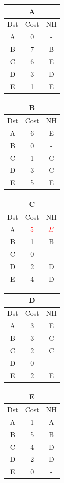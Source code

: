 \documentclass[10pt]{article}
\begin{document}
	\begin{table}[h!]
		\begin{tabular}{|c||c||c|}
 			\hline
	 		\multicolumn{3}{|c|}{A} \\
 			\hline
 			Dst & Cost & NH\\
 			\hline
 			A & 0 & - \\
 			B & 7 & B \\
 			C & 6 & E  \\
 			D & 3 & D \\
 			E & 1 & E \\
 			\hline
		\end{tabular}
		\begin{tabular}{|c||c||c|}
 			\hline
	 		\multicolumn{3}{|c|}{B} \\
 			\hline
 			Dst & Cost & NH\\
 			\hline
 			A & 6 & E \\
 			B & 0 & - \\
 			C & 1 & C  \\
 			D & 3 & C \\
 			E & 5 & E \\
 			\hline
		\end{tabular}
		\begin{tabular}{|c||c||c|}
 			\hline
	 		\multicolumn{3}{|c|}{C} \\
 			\hline
 			Dst & Cost & NH\\
 			\hline
 			A & $\color{red} 5$ & $\color{red} E$ \\
 			B & 1 & B \\
 			C & 0 & - \\
 			D & 2 & D \\
 			E & 4 & D \\
 			\hline
		\end{tabular}
		\begin{tabular}{|c||c||c|}
 			\hline
	 		\multicolumn{3}{|c|}{D} \\
 			\hline
 			Dst & Cost & NH\\
 			\hline
 			A & 3 & E \\
 			B & 3 & C \\
 			C & 2 & C \\
 			D & 0 & - \\
 			E & 2 & E \\
 			\hline
		\end{tabular}
		\begin{tabular}{|c||c||c|}
 			\hline
	 		\multicolumn{3}{|c|}{E} \\
 			\hline
 			Dst & Cost & NH\\
 			\hline
 			A & 1 & A \\
 			B & 5 & B \\
 			C & 4 & D  \\
 			D & 2 & D \\
 			E & 0 & - \\
 			\hline
		\end{tabular}
	\end{table}
	
\end{document}
